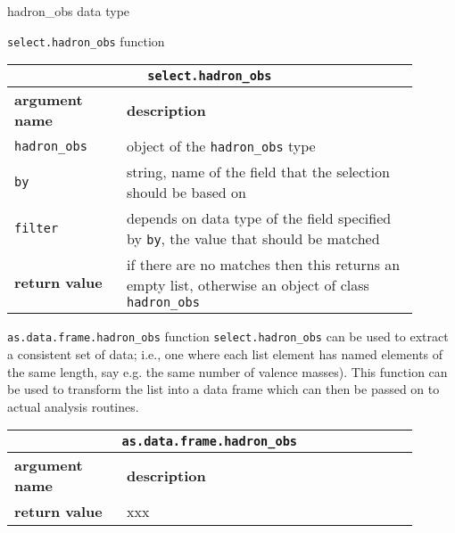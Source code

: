 \documentclass[10pt,a4paper]{article}
\begin{document}
\begin{section}{{\ttfamily hadron\_obs} data type}
\begin{subsection}{{\tt select.hadron\_obs} function}
{ \centering
\begin{tabular}{|p{0.25\linewidth}|p{0.65\linewidth}|}
\hline
\multicolumn{2}{|c|}{ {\tt select.hadron\_obs} } \\
\hline \hline \textbf{argument name} & \textbf{description} \\
\hline {\tt hadron\_obs} & object of the {\tt hadron\_obs} type \\ 
{\tt by} & string, name of the field that the selection should be based on \\ 
{\tt filter} & depends on data type of the field specified by {\tt by}, the value that should be matched \\ 
\hline \hline
\textbf{return value} & if there are no matches then this returns an empty list, otherwise an object of class {\tt hadron\_obs} \\
\hline
\end{tabular}
} %

\end{subsection}

\begin{subsection}{ {\tt as.data.frame.hadron\_obs} function }
{\tt select.hadron\_obs} can be used to extract a consistent set of data; i.e., one where each list element has named elements of the same length, say e.g. the same number of valence masses).
This function can be used to transform the list into a data frame which can then be passed on to actual analysis routines.

{ \centering
\begin{tabular}{|p{0.25\linewidth}|p{0.65\linewidth}|}
\hline
\multicolumn{2}{|c|}{ {\tt as.data.frame.hadron\_obs} } \\
\hline \hline \textbf{argument name} & \textbf{description} \\ \hline
\hline 
\textbf{return value} & xxx \\
\hline
\end{tabular}
} %

\end{subsection}

\end{section} %
\end{document}
